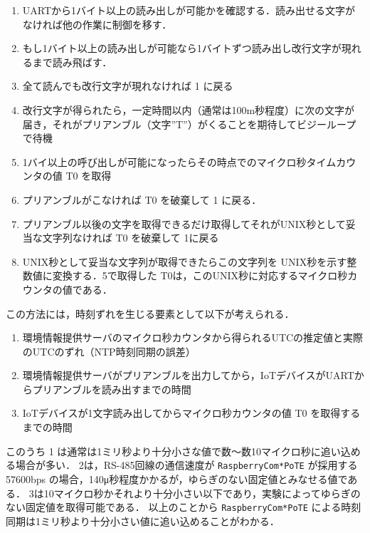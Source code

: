 {\begin{enumerate}
\item UARTから1バイト以上の読み出しが可能かを確認する．読み出せる文字がなければ他の作業に制御を移す．
\item もし1バイト以上の読み出しが可能なら1バイトずつ読み出し改行文字が現れるまで読み飛ばす．
\item 全て読んでも改行文字が現れなければ 1 に戻る
\item 改行文字が得られたら，一定時間以内（通常は100m秒程度）に次の文字が届き，それがプリアンブル（文字''T''）がくることを期待してビジーループで待機
\item 1バイ以上の呼び出しが可能になったらその時点でのマイクロ秒タイムカウンタの値 T0 を取得
\item プリアンブルがこなければ T0 を破棄して 1 に戻る．
\item プリアンブル以後の文字を取得できるだけ取得してそれがUNIX秒として妥当な文字列なければ T0 を破棄して 1に戻る
\item UNIX秒として妥当な文字列が取得できたらこの文字列を UNIX秒を示す整数値に変換する．5で取得した T0は，このUNIX秒に対応するマイクロ秒カウンタの値である．
\end{enumerate}

この方法には，時刻ずれを生じる要素として以下が考えられる．

\begin{enumerate}
\item 環境情報提供サーバのマイクロ秒カウンタから得られるUTCの推定値と実際のUTCのずれ（NTP時刻同期の誤差）
\item 環境情報提供サーバがプリアンブルを出力してから，IoTデバイスがUARTからプリアンブルを読み出すまでの時間
\item IoTデバイスが1文字読み出してからマイクロ秒カウンタの値 T0 を取得するまでの時間
\end{enumerate}

このうち 1 は通常は1ミリ秒より十分小さな値で数〜数10マイクロ秒に追い込める場合が多い．
2は，RS-485回線の通信速度が {\tt Raspberry\-Com*PoTE} が採用する 57600bps の場合，140μ秒程度かかるが，ゆらぎのない固定値とみなせる値である．
3は10マイクロ秒かそれより十分小さい以下であり，実験によってゆらぎのない固定値を取得可能である．
以上のことから {\tt Raspberry\-Com*PoTE} による時刻同期は1ミリ秒より十分小さい値に追い込めることがわかる．

}
